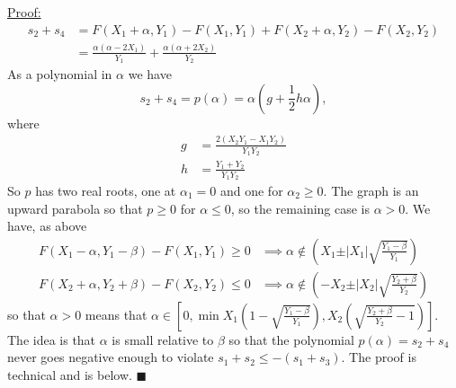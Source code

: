 \documentclass{article}
\theoremstyle{case}
\newenvironment{claimproof}[1]{\par\noindent\underline{Proof:}\space#1}{\hfill $\blacksquare$}
\begin{document}
\begin{claimproof}
\begin{align*}
s_2 + s_4 & = F(X_1 +\alpha, Y_1) - F(X_1, Y_1) + F(X_2 + \alpha, Y_2) - F(X_2, Y_2) \\
& = \frac{\alpha \left( \alpha - 2X_1\right)}{Y_1} + \frac{\alpha \left( \alpha + 2X_2\right)}{Y_2}
\end{align*}
As a polynomial in $\alpha$ we have
\[
s_2 + s_4 = p(\alpha) = \alpha \left( g + \frac{1}{2}h \alpha \right),
\]
where
\begin{align*}
g & = \frac{2 \left( X_2 Y_1 - X_1 Y_2\right)}{Y_1 Y_2} \\
h & = \frac{Y_1 + Y_2}{Y_1 Y_2}
\end{align*}
So $p$ has two real roots, one at $\alpha_1 = 0$ and one for $\alpha_2 \geq 0$. The graph is an upward parabola so that $p \geq 0$ for $\alpha \leq 0$, so the remaining case is $\alpha > 0$. We have, as above
\begin{align*}
F(X_1-\alpha, Y_1-\beta) - F(X_1, Y_1) \geq 0 & \implies \alpha \not \in \left( X_1 \pm \vert X_1\vert \sqrt{\frac{Y_1-\beta}{Y_1}}\right) \\
F(X_2+\alpha, Y_2+\beta) - F(X_2, Y_2) \leq 0 & \implies \alpha \not \in \left( -X_2 \pm \vert X_2\vert \sqrt{\frac{Y_2 +\beta}{Y_2}} \right)
\end{align*}
so that $\alpha > 0$ means that $\alpha \in \left[ 0, \min{X_1\left( 1 - \sqrt{\frac{Y_1-\beta}{Y_1}}\right), X_2\left( \sqrt{\frac{Y_2 + \beta}{Y_2} - 1} \right)}\right]$. The idea is that $\alpha$ is small relative to $\beta$ so that the polynomial $p(\alpha) = s_2 + s_4$ never goes negative enough to violate $s_1 + s_2 \leq -\left( s_1 + s_3\right)$. The proof is technical and is below.
\end{claimproof}
\end{document}
